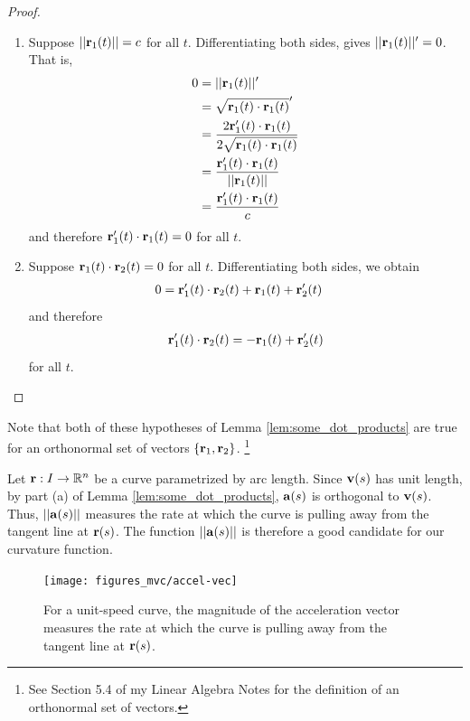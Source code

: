 \documentclass[12pt,letterpaper,reqno]{article}
\numberwithin{equation}{section}
\newcommand{\R}{\ensuremath{\mathbb R}}
\newcommand{\bv}{{\bf v}}
\newcommand{\ba}{{\bf a}}
\newcommand{\bbr}{{\bf r}}
\begin{document}
{\begin{proof}
	\begin{enumerate}[(1)]
		\item Suppose $||\bbr_1(t)||=c$ for all $t$. Differentiating both sides, gives $||\bbr_1(t)||'=0$. That is,
		\begin{align*}
			0&=||\bbr_1(t)||' \\
			&=\sqrt{\bbr_1(t) \cdot \bbr_1(t)}' \\
			&=\frac{2\bbr_1'(t) \cdot \bbr_1(t)}{2\sqrt{\bbr_1(t) \cdot \bbr_1(t)}} \\
			&=\frac{\bbr_1'(t) \cdot \bbr_1(t)}{||\bbr_1(t)||} \\
			&=\frac{\bbr_1'(t) \cdot \bbr_1(t)}{c} \\
		\end{align*}
		and therefore $\bbr_1'(t) \cdot \bbr_1(t)=0$ for all $t$.
		\item Suppose $\bbr_1(t) \cdot \bbr_2(t)=0$ for all $t$. Differentiating both sides, we obtain
		\begin{align*}
			0&=\bbr_1'(t) \cdot \bbr_2(t)+\bbr_1(t)+\bbr_2'(t)
		\end{align*}
		and therefore
		\begin{align*}
			\bbr_1'(t) \cdot \bbr_2(t)=-\bbr_1(t)+\bbr_2'(t)
		\end{align*}
		for all $t$.
	\end{enumerate}
\end{proof}

Note that both of these hypotheses of Lemma \ref{lem:some_dot_products} are true for an orthonormal set of vectors $\{\bbr_1,\bbr_2\}$. \footnote{See Section 5.4 of my Linear Algebra Notes for the definition of an orthonormal set of vectors.}

Let $\bbr:I \to \R^n$ be a curve parametrized by arc length. Since $\bv(s)$ has unit length, by part (a) of Lemma \ref{lem:some_dot_products}, $\ba(s)$ is orthogonal to $\bv(s)$. Thus, $||\ba(s)||$ measures the rate at which the curve is pulling away from the tangent line at $\bbr(s)$. The function $||\ba(s)||$ is therefore a good candidate for our curvature function.

\begin{figure}[h]
	\begin{center}
		\texttt{[image: figures\_mvc/accel-vec]}
	\end{center}
	\caption{For a unit-speed curve, the magnitude of the acceleration vector measures the rate at which the curve is pulling away from the tangent line at $\bbr(s)$.}
\end{figure}

}
\end{document}
